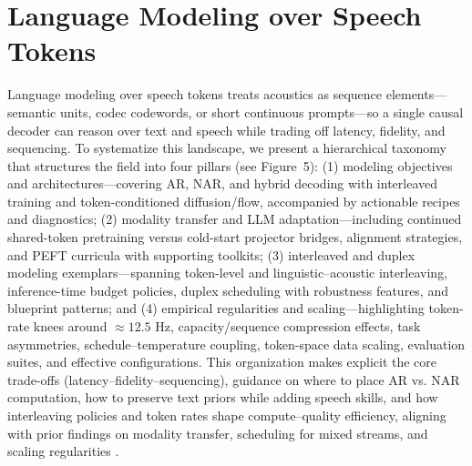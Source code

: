 \documentclass{article}
\begin{document}
\section{Language Modeling over Speech Tokens} \label{sec:Language Modeling over Speech Tokens}


Language modeling over speech tokens treats acoustics as sequence elements---semantic units, codec codewords, or short continuous prompts---so a single causal decoder can reason over text and speech while trading off latency, fidelity, and sequencing. To systematize this landscape, we present a hierarchical taxonomy that structures the field into four pillars (see Figure~5): (1) modeling objectives and architectures---covering AR, NAR, and hybrid decoding with interleaved training and token-conditioned diffusion/flow, accompanied by actionable recipes and diagnostics; (2) modality transfer and LLM adaptation---including continued shared-token pretraining versus cold-start projector bridges, alignment strategies, and PEFT curricula with supporting toolkits; (3) interleaved and duplex modeling exemplars---spanning token-level and linguistic--acoustic interleaving, inference-time budget policies, duplex scheduling with robustness features, and blueprint patterns; and (4) empirical regularities and scaling---highlighting token-rate knees around $\approx 12.5$ Hz, capacity/sequence compression effects, task asymmetries, schedule--temperature coupling, token-space data scaling, evaluation suites, and effective configurations. This organization makes explicit the core trade-offs (latency--fidelity--sequencing), guidance on where to place AR vs. NAR computation, how to preserve text priors while adding speech skills, and how interleaving policies and token rates shape compute--quality efficiency, aligning with prior findings on modality transfer, scheduling for mixed streams, and scaling regularities \cite{zeng2024scalingspeechtextpretrainingsyntheticint,wang2025tadicodectextawarediffusionspeechtokeniz}.
\end{document}
